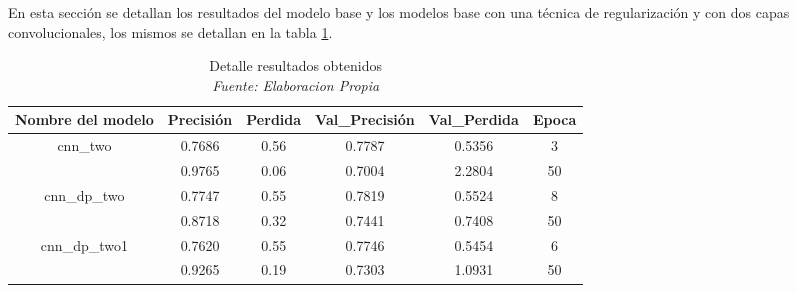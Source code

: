 En esta sección se detallan los resultados del modelo base y  los modelos  base con una técnica de regularización y con dos capas convolucionales, los mismos se detallan en  la tabla \ref{tbl:12}.

\begin{table}[!ht]
	\centering
	\begin{tabular}{|c|c|c|c|c|c|}
		\hline
		\textbf{Nombre del modelo} & \textbf{Precisión} & \textbf{Perdida} & \textbf{Val\_Precisión} & \textbf{Val\_Perdida} & \textbf{Epoca} \\ \hline
		cnn\_two & 0.7686 & 0.56 & 0.7787 & 0.5356 & 3 \\ \cline{2-6}
		~ & 0.9765 & 0.06 & 0.7004 & 2.2804 & 50 \\ \hline
		cnn\_dp\_two & 0.7747 & 0.55 & 0.7819 & 0.5524 & 8 \\ \cline{2-6}
		~ & 0.8718 & 0.32 & 0.7441 & 0.7408 & 50 \\ \hline
		cnn\_dp\_two1 & 0.7620 & 0.55 & 0.7746 & 0.5454 & 6 \\ \cline{2-6}
		~ & 0.9265 & 0.19 & 0.7303 & 1.0931 & 50 \\ \hline
	\end{tabular}
	\caption{Detalle resultados obtenidos
		\\\textit{Fuente: Elaboracion Propia}}
	\label{tbl:12}
\end{table}



